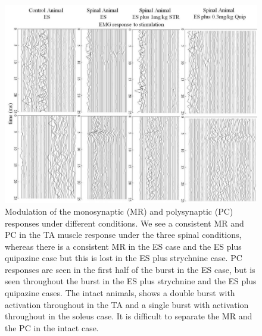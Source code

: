 \documentclass[]{elsarticle}
\begin{document}

\begin{figure}[ht!]
	\centering
	\includegraphics[width=1\textwidth]{new_pic/pic1.png}
	\caption{
    Modulation of the monosynaptic (MR) and polysynaptic (PC) responses under different conditions. We see a consistent MR and PC in the TA muscle response under the three spinal conditions, whereas there is a consistent MR in the ES case and the ES plus quipazine case but this is lost in the ES plus strychnine case. PC responses are seen in the first half of the burst in the ES case, but is seen throughout the burst in the ES plus strychnine and the ES plus quipazine cases. The intact animals, shows a double burst with activation throughout in the TA and a single burst with activation throughout in the soleus case. It is difficult to separate the MR and the PC in the intact case.
    }
    \label{fig:lavrov_updates1}
\end{figure}
\end{document}
